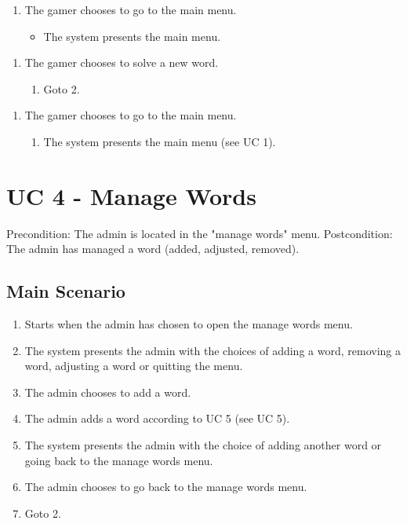 \documentclass[12pt, letterpaper]{article}
\begin{document}
\begin{enumerate}[label=3.1.]
\begin{enumerate}[label=3.1 b]
\begin{enumerate}[label=3.1 b.\arabic*]
			\begin{enumerate}[label=3.1 b.3.]
				\item The gamer chooses to go to the main menu.
				\begin{itemize}
					\item The system presents the main menu. 
				\end{itemize}
			\end{enumerate}
				
		\end{enumerate}
	\end{enumerate}
\end{enumerate}
\begin{enumerate}[label=7.1.]
	\item The gamer chooses to solve a new word. 
	\begin{enumerate}[label=7.1.\arabic*]
		\item Goto 2.
	\end{enumerate}
\end{enumerate}
\begin{enumerate}[label=9.1.]
	\item The gamer chooses to go to the main menu. 
	\begin{enumerate}[label=9.1.\arabic*]
		\item The system presents the main menu (see UC 1).
	\end{enumerate}
\end{enumerate}

\section{UC 4 - Manage Words}
Precondition: The admin is located in the "manage words" menu.
\newline
Postcondition: The admin has managed a word (added, adjusted, removed).
\subsection{Main Scenario}
\begin{enumerate}
	\item Starts when the admin has chosen to open the manage words menu.
	\item The system presents the admin with the choices of adding a word, removing a word, adjusting a word or quitting the menu.
	\item The admin chooses to add a word.
	\item The admin adds a word according to UC 5 (see UC 5).
	\item The system presents the admin with the choice of adding another word or going back to the manage words menu.
	\item The admin chooses to go back to the manage words menu.
	\item Goto 2.
\end{enumerate}
\end{document}
